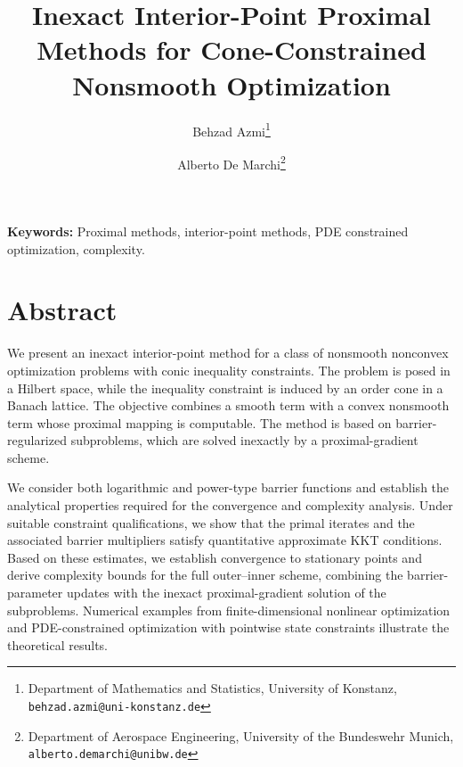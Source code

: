 \documentclass[11pt]{article}
\title{\bfseries Inexact Interior-Point Proximal Methods for Cone-Constrained Nonsmooth Optimization}
\author{
Behzad Azmi\thanks{Department of Mathematics and Statistics, University of Konstanz, 
\texttt{behzad.azmi@uni-konstanz.de}}
\and
Alberto De Marchi\thanks{Department of Aerospace Engineering, University of the Bundeswehr Munich,
\texttt{alberto.demarchi@unibw.de}}
}
\date{}
\begin{document}
\maketitle

\vspace{-1em}

\noindent
\textbf{Keywords:}
Proximal methods, interior-point methods, PDE constrained optimization, complexity.

\vspace{0.5em}


\vspace{1em}

\section*{Abstract}

We present an inexact interior-point method for a class of nonsmooth nonconvex optimization problems with conic inequality constraints. The problem is posed in a Hilbert space, while the inequality constraint is induced by an order cone in a Banach lattice. The objective combines a smooth term with a convex nonsmooth term whose proximal mapping is computable. The method is based on barrier-regularized subproblems, which are solved inexactly by a proximal-gradient scheme.

We consider both logarithmic and power-type barrier functions and establish the analytical properties required for the convergence and complexity analysis. Under suitable constraint qualifications, we show that the primal iterates and the associated barrier multipliers satisfy quantitative approximate KKT conditions. Based on these estimates, we establish convergence to stationary points and derive complexity bounds for the full outer–inner scheme, combining the barrier-parameter updates with the inexact proximal-gradient solution of the subproblems. Numerical examples from finite-dimensional nonlinear optimization and PDE-constrained optimization with pointwise state constraints illustrate the theoretical results.

%

%
%
%
%
\end{document}
